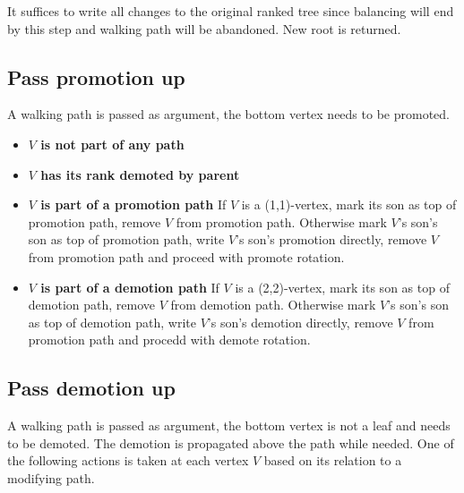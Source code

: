 It suffices to write all changes to the original ranked tree since balancing will end by this step and walking path will be abandoned. New root is returned.

\subsection{Pass promotion up}

A walking path is passed as argument, the bottom vertex needs to be promoted.

\begin{itemize}

\item {\bfseries $V$ is not part of any path}

\item {\bfseries $V$ has its rank demoted by parent}

\item {\bfseries $V$ is part of a promotion path} If $V$ is a (1,1)-vertex, mark its son as top of promotion path, remove $V$ from promotion path. Otherwise mark $V$'s son's son as top of promotion path, write $V$'s son's promotion directly, remove $V$ from promotion path and proceed with promote rotation. 

\item {\bfseries $V$ is part of a demotion path} If $V$ is a (2,2)-vertex, mark its son as top of demotion path, remove $V$ from demotion path. Otherwise mark $V$'s son's son as top of demotion path, write $V$'s son's demotion directly, remove $V$ from promotion path and procedd with demote rotation.

\end{itemize}

\subsection{Pass demotion up}

A walking path is passed as argument, the bottom vertex is not a leaf and needs to be demoted. The demotion is propagated above the path while needed. One of the following actions is taken at each vertex $V$ based on its relation to a modifying path.

